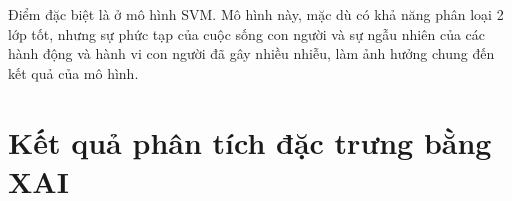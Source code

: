 Điểm đặc biệt là ở mô hình SVM. Mô hình này, mặc dù có khả năng phân loại 2 lớp tốt, nhưng sự phức tạp của cuộc sống con người và sự ngẫu nhiên của các hành động và hành vi con người đã gây nhiều nhiễu, làm ảnh hưởng chung đến kết quả của mô hình. 

\section{Kết quả phân tích đặc trưng bằng XAI}
\begin{figure}[!ht]
\end{figure}
